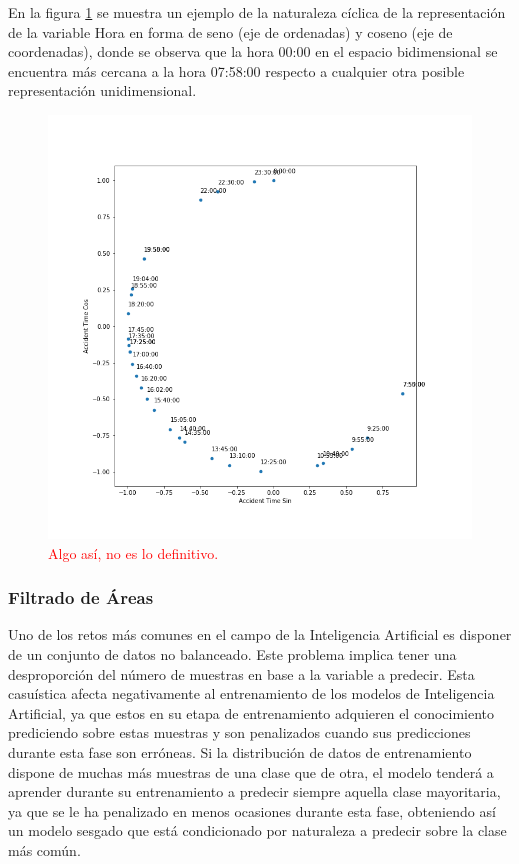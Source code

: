 \documentclass{uathesis-es}
\begin{document}
En la figura \ref{HoursPlot} se muestra un ejemplo de la naturaleza cíclica de la representación de la variable Hora en forma de seno (eje de ordenadas) y coseno (eje de coordenadas), donde se observa que la hora 00:00 en el espacio bidimensional se encuentra más cercana a la hora 07:58:00 respecto a cualquier otra posible representación unidimensional.

\begin{figure}[H]
    \centering
    \includegraphics[width=12cm]{Figures/hours.png}
    \caption{\textcolor{red}{Algo así, no es lo definitivo.}}
    \label{HoursPlot}
\end{figure}

\subsubsection{Filtrado de Áreas}

Uno de los retos más comunes en el campo de la Inteligencia Artificial es disponer de un conjunto de datos no balanceado. Este problema implica tener una desproporción del número de muestras en base a la variable a predecir. Esta casuística afecta negativamente al entrenamiento de los modelos de Inteligencia Artificial, ya que estos en su etapa de entrenamiento adquieren el conocimiento prediciendo sobre estas muestras y son penalizados cuando sus predicciones durante esta fase son erróneas. Si la distribución de datos de entrenamiento dispone de muchas más muestras de una clase que de otra, el modelo tenderá a aprender durante su entrenamiento a predecir siempre aquella clase mayoritaria, ya que se le ha penalizado en menos ocasiones durante esta fase, obteniendo así un modelo sesgado que está condicionado por naturaleza a predecir sobre la clase más común.
\end{document}
